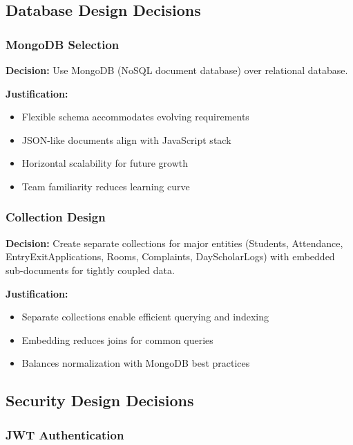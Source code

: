 \documentclass[12pt]{article}
\begin{document}
\subsection{Database Design Decisions}

\subsubsection{MongoDB Selection}

\textbf{Decision:} Use MongoDB (NoSQL document database) over relational database.

\textbf{Justification:}

\begin{itemize}
\item Flexible schema accommodates evolving requirements
\item JSON-like documents align with JavaScript stack
\item Horizontal scalability for future growth
\item Team familiarity reduces learning curve
\end{itemize}

\subsubsection{Collection Design}

\textbf{Decision:} Create separate collections for major entities (Students, Attendance, EntryExitApplications, Rooms, Complaints, DayScholarLogs) with embedded sub-documents for tightly coupled data.

\textbf{Justification:}

\begin{itemize}
\item Separate collections enable efficient querying and indexing
\item Embedding reduces joins for common queries
\item Balances normalization with MongoDB best practices
\end{itemize}

\subsection{Security Design Decisions}

\subsubsection{JWT Authentication}
\end{document}
